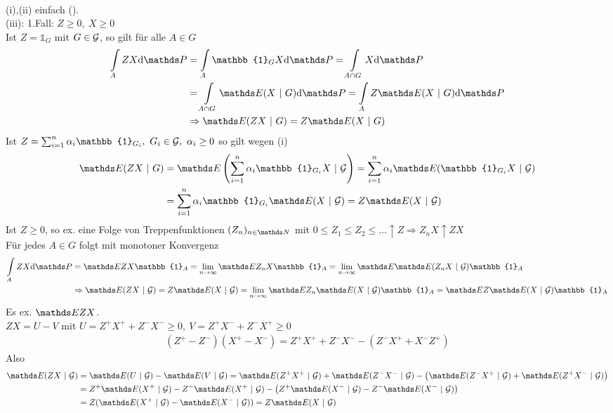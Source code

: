 \\
(i),(ii) einfach (\checkmark).\\
(iii): 1.Fall: $Z\ge 0,~X\ge0$\\
Ist $Z=\mathbb{1}_G$ mit $G\in \mathcal{G}$, so gilt für alle $A\in G$ 
\begin{equation*}
\begin{aligned}
	\int\limits_A ZX\dint \Pw &=\int\limits_A \mathbb{1}_G X\dint \Pw =\int\limits_{A\cap G}X\dint\Pw\\
	&= \int\limits_{A\cap G}\E(X~|~G)\dint\Pw =\int\limits_A Z\E(X~|~G)\dint\Pw\\
	&\Rightarrow \E(ZX~|~G)=Z\E(X~|~G)
\end{aligned}
\end{equation*}
Ist $Z=\sum_{i=1}^{n}\alpha_i \mathbb{1}_{G_i},~ G_i\in \G,~\alpha_i\ge 0$ so gilt wegen (i)
\begin{equation*}
\begin{aligned}
	\E(ZX~|~G)&=\E\enbrace{\sum_{i=1}^{n}\alpha_i\mathbb{1}_{G_i}X~|~\G}= \sum_{i=1}^{n}\alpha_i\E(\mathbb{1}_{G_i}X~|~\G)\\
	&= \sum_{i=1}^{n}\alpha_i\mathbb{1}_{G_i}\E(X~|~\G)=Z\E(X~|~\G)
\end{aligned}
\end{equation*}
Ist $Z\ge0$, so ex. eine Folge von Treppenfunktionen $(Z_n)_{n\in \N}$ mit $0\le Z_1\le Z_2\le \dots \uparrow Z \Rightarrow Z_nX\uparrow ZX$\\
Für jedes $A\in G$ folgt mit monotoner Konvergenz 
\begin{equation*}
\begin{aligned}
	\int\limits_A ZX\dint\Pw &= \E ZX\mathbb{1}_A = \lim\limits_{n\to\infty}\E Z_nX\mathbb{1}_A =\lim\limits_{n\to\infty} \E\E(Z_nX~|~\G)\mathbb{1}_A\\
	&\Rightarrow \E(ZX~|~\G)=Z\E(X~|~\G)=\lim\limits_{n\to \infty}\E Z_n\E(X~|~\G)\mathbb{1}_A=\E Z\E(X~|~\G)\mathbb{1}_A
\end{aligned}
\end{equation*}
Es ex. $\E ZX$.\\ $ZX=U-V$ mit $U=Z^+X^++Z^-X^-\ge0,~V=Z^+X^-+Z^-X^+\ge0$
\begin{equation*}
\begin{aligned}
	(Z^+-Z^-)(X^+-X^-)= Z^+X^++Z^-X^- -(Z^-X^++X^-Z^+)
\end{aligned}
\end{equation*}
Also \begin{equation*}
\begin{aligned}
	\E(ZX~|~\G) &= \E(U~|~\G)-\E(V~|~\G)= \E(Z^+X^+~|~\G)+\E(Z^-X^-~|~\G)-\big(\E(Z^-X^+~|~\G)+\E(Z^+X^-~|~\G)\big)\\
	&= Z^+\E(X^+~|~\G)-Z^-\E(X^+~|~\G)-\big(Z^+\E(X^-~|~\G)-Z^-\E(X^-~|~\G)\big)\\
	&= Z(\E(X^+~|~\G)-\E(X^-~|~\G)) = Z\E(X~|~\G)
\end{aligned}
\end{equation*}

